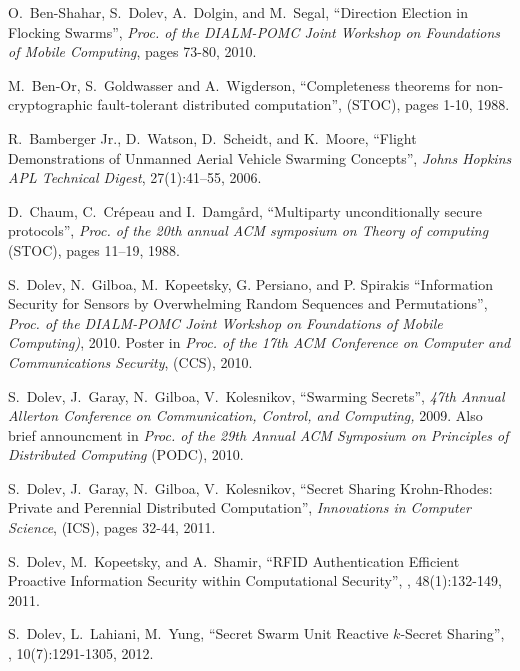 \documentclass[letterpaper,11pt]{article}
\begin{document}
{\small

\begin{thebibliography}{99}

 O.\ Ben-Shahar, S.\ Dolev, A.\ Dolgin, and M.\ Segal,
\newblock ``Direction Election in Flocking Swarms'', 
\newblock \textit{Proc. of the DIALM-POMC Joint Workshop on Foundations of Mobile Computing}, pages 73-80, 2010.


M.\ Ben-Or, S.\ Goldwasser and A.\ Wigderson,
\newblock ``Completeness theorems for non-cryptographic fault-tolerant distributed computation'',
 (STOC), pages 1-10, 1988.

R.\ Bamberger Jr., D.\ Watson, D.\ Scheidt, and K.\ Moore,
``Flight Demonstrations of Unmanned Aerial Vehicle Swarming Concepts'',
{\em Johns Hopkins APL Technical Digest}, 27(1):41--55, 2006.

 D.\ Chaum, C.\ Cr\'{e}peau and I.\ Damg{\aa}rd,
``Multiparty unconditionally secure protocols'', {\it Proc. of the 20th annual ACM symposium on Theory of computing} (STOC), pages 11--19, 1988.

S.\ Dolev, N.\ Gilboa, M.\ Kopeetsky, G. Persiano, and P. Spirakis ``Information Security for
Sensors by Overwhelming Random Sequences and Permutations'', \textit{Proc. of the DIALM-POMC Joint Workshop on Foundations of Mobile Computing)}, 2010. Poster in \textit{Proc. of the 17th ACM Conference on Computer and Communications Security}, (CCS), 2010.

S.\ Dolev, J.\ Garay, N.\ Gilboa, V.\ Kolesnikov,
``Swarming Secrets'',
{\it 47th Annual Allerton Conference on Communication, Control, and Computing,}
2009. Also brief announcment in {\it Proc. of the 29th Annual ACM Symposium on Principles of Distributed Computing} (PODC), 2010.

S.\ Dolev, J.\ Garay, N.\ Gilboa, V.\ Kolesnikov,
``Secret Sharing Krohn-Rhodes: Private and Perennial Distributed Computation'',
{\it Innovations in Computer Science}, (ICS), pages 32-44, 2011.

 S.\ Dolev, M.\ Kopeetsky, and A.\ Shamir,
\newblock ``RFID Authentication Efficient Proactive Information Security within Computational Security'',
, 48(1):132-149, 2011.


 S.\ Dolev, L.\ Lahiani, M.\ Yung,
\newblock ``Secret Swarm Unit Reactive $k$-Secret Sharing'',
, 10(7):1291-1305, 2012.




\end{thebibliography}}
\end{document}
